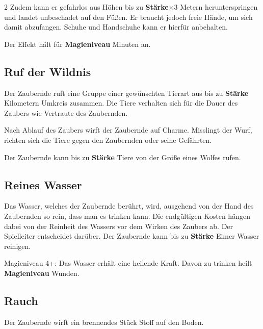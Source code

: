 \begin{multicols*}{2}
Zudem kann er gefahrlos aus Höhen bis zu \textbf{Stärke}×3 Metern herunterspringen und landet unbeschadet auf den Füßen. Er braucht jedoch freie Hände, um sich damit abzufangen. Schuhe und Handschuhe kann er hierfür anbehalten.

Der Effekt hält für \textbf{Magieniveau} Minuten an.



\subsection{Ruf der Wildnis}

Der Zaubernde ruft eine Gruppe einer gewünschten Tierart aus bis zu \textbf{Stärke} Kilometern Umkreis zusammen. Die Tiere verhalten sich für die Dauer des Zaubers wie Vertraute des Zaubernden.

Nach Ablauf des Zaubers wirft der Zaubernde auf Charme. Misslingt der Wurf, richten sich die Tiere gegen den Zaubernden oder seine Gefährten.

Der Zaubernde kann bis zu \textbf{Stärke} Tiere von der Größe eines Wolfes rufen.



\subsection{Reines Wasser}

Das Wasser, welches der Zaubernde berührt, wird, ausgehend von der Hand des Zaubernden so rein, dass man es trinken kann. Die endgültigen Kosten hängen dabei von der Reinheit des Wassers vor dem Wirken des Zaubers ab. Der Spielleiter entscheidet darüber. Der Zaubernde kann bis zu \textbf{Stärke} Eimer Wasser reinigen.

Magieniveau 4+: Das Wasser erhält eine heilende Kraft. Davon zu trinken heilt \textbf{Magieniveau} Wunden.



\subsection{Rauch}

Der Zaubernde wirft ein brennendes Stück Stoff auf den Boden.


\end{multicols*}
